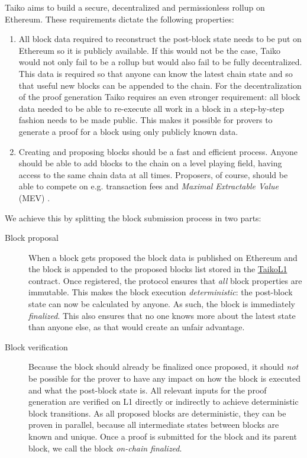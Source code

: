\documentclass[9pt,oneside]{amsart}
\begin{document}
\begin{multicols}{2}
Taiko aims to build a secure, decentralized and permissionless rollup on Ethereum. These requirements dictate the following properties:
\begin{enumerate}
\item All block data required to reconstruct the post-block state needs to be put on Ethereum so it is publicly available. If this would not be the case, Taiko would not only fail to be a rollup but would also fail to be fully decentralized. This data is required so that anyone can know the latest chain state and so that useful new blocks can be appended to the chain. For the decentralization of the proof generation Taiko requires an even stronger requirement: all block data needed to be able to re-execute all work in a block in a step-by-step fashion needs to be made public. This makes it possible for provers to generate a proof for a block using only publicly known data.
\item Creating and proposing blocks should be a fast and efficient process. Anyone should be able to add blocks to the chain on a level playing field, having access to the same chain data at all times. Proposers, of course, should be able to compete on e.g. transaction fees and \emph{Maximal Extractable Value} (MEV) \cite{mev}.
\end{enumerate}

We achieve this by splitting the block submission process in two parts:
\begin{description}
\item[Block proposal] When a block gets proposed the block data is published on Ethereum and the block is appended to the proposed blocks list stored in the \underline{TaikoL1} contract. Once registered, the protocol ensures that \emph{all} block properties are immutable. This makes the block execution \emph{deterministic}: the post-block state can now be calculated by anyone. As such, the block is immediately \emph{finalized}. This also ensures that no one knows more about the latest state than anyone else, as that would create an unfair advantage.
\item[Block verification] Because the block should already be finalized once proposed, it should \emph{not} be possible for the prover to have any impact on how the block is executed and what the post-block state is. All relevant inputs for the proof generation are verified on L1 directly or indirectly to achieve deterministic block transitions. As all proposed blocks are deterministic, they can be proven in parallel, because all intermediate states between blocks are known and unique. Once a proof is submitted for the block and its parent block, we call the block \emph{on-chain finalized}.
\end{description}


\end{multicols}
\end{document}
